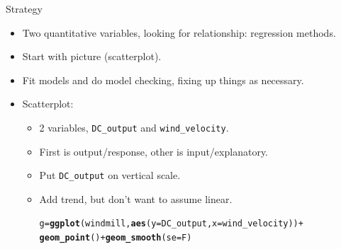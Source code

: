 \documentclass[unknownkeysallowed]{beamer}\usepackage[]{graphicx}\usepackage[]{color}
\makeatletter
\newcommand{\hlopt}[1]{\textcolor[rgb]{0,0,0}{#1}}%
\newcommand{\hlstd}[1]{\textcolor[rgb]{0.345,0.345,0.345}{#1}}%
\newcommand{\hlkwb}[1]{\textcolor[rgb]{0.69,0.353,0.396}{#1}}%
\newcommand{\hlkwc}[1]{\textcolor[rgb]{0.333,0.667,0.333}{#1}}%
\newcommand{\hlkwd}[1]{\textcolor[rgb]{0.737,0.353,0.396}{\textbf{#1}}}%
\newenvironment{kframe}{%
 \def\at@end@of@kframe{}%
 \ifinner\ifhmode%
  \def\at@end@of@kframe{\end{minipage}}%
  \begin{minipage}{\columnwidth}%
 \fi\fi%
 \def\FrameCommand##1{\hskip\@totalleftmargin \hskip-\fboxsep
 \colorbox{shadecolor}{##1}\hskip-\fboxsep
     \hskip-\linewidth \hskip-\@totalleftmargin \hskip\columnwidth}%
 \MakeFramed {\advance\hsize-\width
   \@totalleftmargin\z@ \linewidth\hsize
   \@setminipage}}%
 {\par\unskip\endMakeFramed%
 \at@end@of@kframe}
\newenvironment{knitrout}{}{} %
\makeatother
\begin{document}
\begin{frame}[fragile]{Strategy}

  \begin{itemize}
  \item Two quantitative variables, looking for relationship:
    regression methods.
  \item Start with picture (scatterplot).
  \item Fit models and do model checking, fixing up things as necessary.
  \item Scatterplot:
    \begin{itemize}
    \item 2 variables, \texttt{DC\_output} and \texttt{wind\_velocity}.
    \item First is output/response, other is input/explanatory.
    \item Put \texttt{DC\_output} on vertical scale.
    \item Add trend, but don't want to assume linear.


\begin{knitrout}
\color{fgcolor}\begin{kframe}
\begin{alltt}
\hlstd{g}\hlkwb{=}\hlkwd{ggplot}\hlstd{(windmill,}\hlkwd{aes}\hlstd{(}\hlkwc{y}\hlstd{=DC_output,}\hlkwc{x}\hlstd{=wind_velocity))}\hlopt{+}
  \hlkwd{geom_point}\hlstd{()}\hlopt{+}\hlkwd{geom_smooth}\hlstd{(}\hlkwc{se}\hlstd{=F)}
\end{alltt}
\end{kframe}
\end{knitrout}
    \end{itemize}
  

  \end{itemize}


\end{frame}
\end{document}
